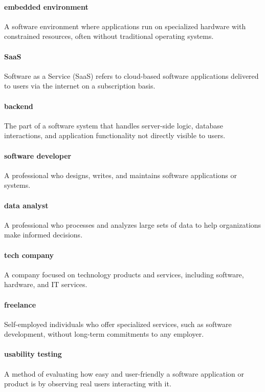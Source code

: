 \documentclass[12pt]{article}
\begin{document}
\paragraph*{embedded environment}
A software environment where applications run on specialized hardware with constrained resources, often without traditional operating systems.

\paragraph*{SaaS}
Software as a Service (SaaS) refers to cloud-based software applications delivered to users via the internet on a subscription basis.

\paragraph*{backend}
The part of a software system that handles server-side logic, database interactions, and application functionality not directly visible to users.

\paragraph*{software developer}
A professional who designs, writes, and maintains software applications or systems.

\paragraph*{data analyst}
A professional who processes and analyzes large sets of data to help organizations make informed decisions.

\paragraph*{tech company}
A company focused on technology products and services, including software, hardware, and IT services.

\paragraph*{freelance}
Self-employed individuals who offer specialized services, such as software development, without long-term commitments to any employer.

\paragraph*{usability testing}
A method of evaluating how easy and user-friendly a software application or product is by observing real users interacting with it.
\end{document}
